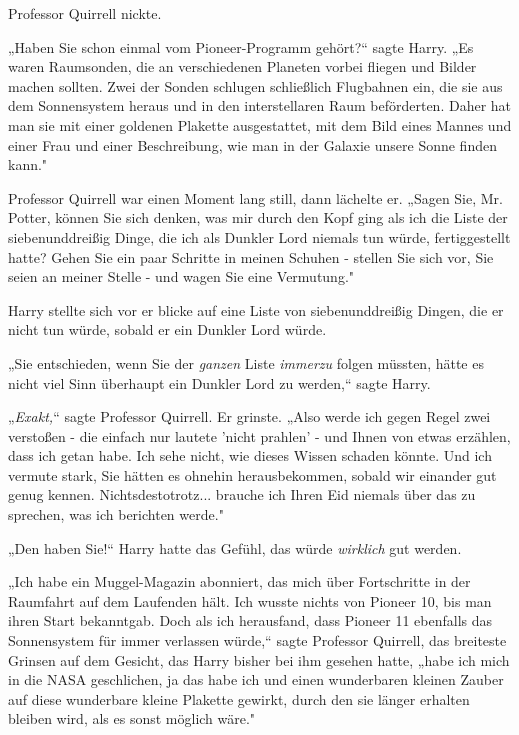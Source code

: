 {Professor Quirrell nickte.

„Haben Sie schon einmal vom Pioneer-Programm gehört?“ sagte Harry. „Es waren Raumsonden, die an verschiedenen Planeten vorbei fliegen und Bilder machen sollten. Zwei der Sonden schlugen schließlich Flugbahnen ein, die sie aus dem Sonnensystem heraus und in den interstellaren Raum beförderten. Daher hat man sie mit einer goldenen Plakette ausgestattet, mit dem Bild eines Mannes und einer Frau und einer Beschreibung, wie man in der Galaxie unsere Sonne finden kann."

Professor Quirrell war einen Moment lang still, dann lächelte er. „Sagen Sie, Mr. Potter, können Sie sich denken, was mir durch den Kopf ging als ich die Liste der siebenunddreißig Dinge, die ich als Dunkler Lord niemals tun würde, fertiggestellt hatte? Gehen Sie ein paar Schritte in meinen Schuhen - stellen Sie sich vor, Sie seien an meiner Stelle - und wagen Sie eine Vermutung."

Harry stellte sich vor er blicke auf eine Liste von siebenunddreißig Dingen, die er nicht tun würde, sobald er ein Dunkler Lord würde.

„Sie entschieden, wenn Sie der \emph{ganzen} Liste \emph{immerzu} folgen müssten, hätte es nicht viel Sinn überhaupt ein Dunkler Lord zu werden,“ sagte Harry.

„\emph{Exakt,}“ sagte Professor Quirrell. Er grinste. „Also werde ich gegen Regel zwei verstoßen - die einfach nur lautete 'nicht prahlen' - und Ihnen von etwas erzählen, dass ich getan habe. Ich sehe nicht, wie dieses Wissen schaden könnte. Und ich vermute stark, Sie hätten es ohnehin herausbekommen, sobald wir einander gut genug kennen. Nichtsdestotrotz... brauche ich Ihren Eid niemals über das zu sprechen, was ich berichten werde."

„Den haben Sie!“ Harry hatte das Gefühl, das würde \emph{wirklich} gut werden.

„Ich habe ein Muggel-Magazin abonniert, das mich über Fortschritte in der Raumfahrt auf dem Laufenden hält. Ich wusste nichts von Pioneer 10, bis man ihren Start bekanntgab. Doch als ich herausfand, dass Pioneer 11 ebenfalls das Sonnensystem für immer verlassen würde,“ sagte Professor Quirrell, das breiteste Grinsen auf dem Gesicht, das Harry bisher bei ihm gesehen hatte, „habe ich mich in die NASA geschlichen, ja das habe ich und einen wunderbaren kleinen Zauber auf diese wunderbare kleine Plakette gewirkt, durch den sie länger erhalten bleiben wird, als es sonst möglich wäre."

}
